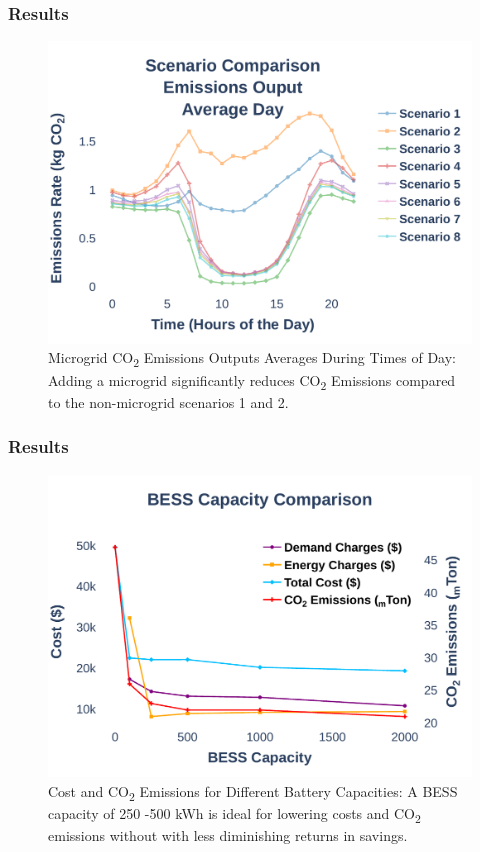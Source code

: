 \documentclass[aspectratio=169, 8 pt]{beamer}
\begin{document}
		\begin{frame}
			\frametitle{Results}
			\begin{figure}
				\centering
				\includegraphics[width=0.7\linewidth]{Fig/emissions_scenario_comparison_run_3_large_font}
				\caption{Microgrid CO\textsubscript{2} Emissions Outputs Averages During Times of Day: Adding a microgrid significantly reduces CO\textsubscript{2} Emissions compared to the non-microgrid scenarios 1 and 2.}
				\label{fig:emissionsscenariocomparison}
			\end{figure}
		\end{frame}
	
		\begin{frame}
			\frametitle{Results}
			\begin{figure}
				\centering
				\includegraphics[width=0.7\linewidth]{Fig/bess_capacity_comparison_large_font}
				\caption{Cost and CO\textsubscript{2} Emissions for Different Battery Capacities: A BESS capacity of 250 -500 kWh is ideal for lowering costs and CO\textsubscript{2} emissions without with less diminishing returns in savings. }
				\label{fig:besscapacitycomparison}
			\end{figure}
		\end{frame}
		
\end{document}
